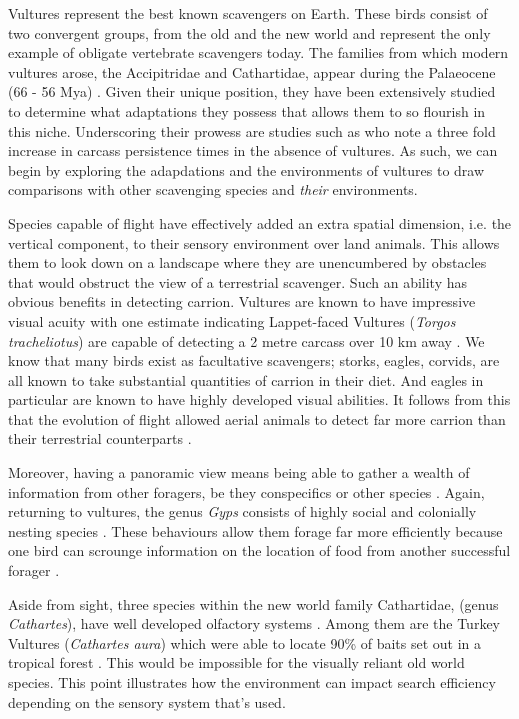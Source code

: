 \documentclass[a4paper,12pt]{article}
\begin{document}
Vultures represent the best known scavengers on Earth.
These birds consist of two convergent groups, from the old and the new world and represent the only example of obligate vertebrate scavengers today.
The families from which modern vultures arose, the Accipitridae and Cathartidae, appear during the Palaeocene (66 - 56 Mya) \citep{Jetz2012, Jarvis2014}.
Given their unique position, they have been extensively studied to determine what adaptations they possess that allows them to so flourish in this niche.
Underscoring their prowess are studies such as \cite{ogada2012effects} who note a three fold increase in carcass persistence times in the absence of vultures.
As such, we can begin by exploring the adapdations and the environments of vultures to draw comparisons with other scavenging species and \textit{their} environments.




Species capable of flight have effectively added an extra spatial dimension, i.e. the vertical component, to their sensory environment over land animals.
This allows them to look down on a landscape where they are unencumbered by obstacles that would obstruct the view of a terrestrial scavenger.
Such an ability has obvious benefits in detecting carrion.
Vultures are known to have impressive visual acuity with one estimate indicating Lappet-faced Vultures (\textit{Torgos tracheliotus}) are capable of detecting a 2 metre carcass over 10 km away \citep{spiegel2013factors}.
We know that many birds exist as facultative scavengers; storks, eagles, corvids, are all known to take substantial quantities of carrion in their diet.
And eagles in particular are known to have highly developed visual abilities.
It follows from this that the evolution of flight allowed aerial animals to detect far more carrion than their terrestrial counterparts \citep{AR:AR22815}.

Moreover, having a panoramic view means being able to gather a wealth of information from other foragers, be they conspecifics or other species \citep{jackson2008effect}.
Again, returning to vultures, the genus \textit{Gyps} consists of highly social and colonially nesting species \citep{fernandez2015density}.
These behaviours allow them forage far more efficiently because one bird can scrounge information on the location of food from another successful forager \citep{KaneVul}.


Aside from sight, three species within the new world family Cathartidae, (genus \textit{Cathartes}), have well developed olfactory systems \citep{AR:AR22815}.
Among them are the Turkey Vultures (\textit{Cathartes aura}) which were able to locate 90\% of baits set out in a tropical forest \citep{houston1986olfaction}.
This would be impossible for the visually reliant old world species.
This point illustrates how the environment can impact search efficiency depending on the sensory system that's used.
\end{document}
